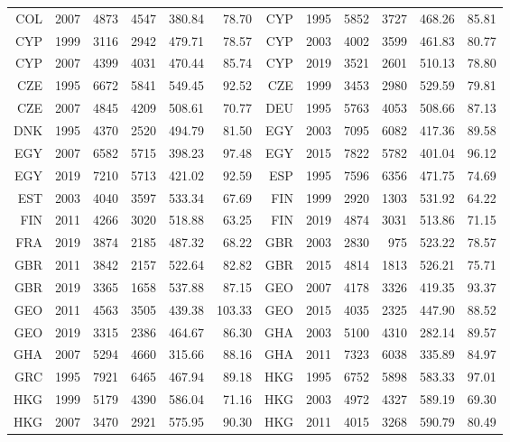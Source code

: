 {\begin{longtable}{r|r|r|r|r|r||r|r|r|r|r|r}
    COL   & 2007  & 4873  & 4547  & 380.84 & 78.70  & CYP   & 1995  & 5852  & 3727  & 468.26 & 85.81 \\
    CYP   & 1999  & 3116  & 2942  & 479.71 & 78.57  & CYP   & 2003  & 4002  & 3599  & 461.83 & 80.77 \\
    CYP   & 2007  & 4399  & 4031  & 470.44 & 85.74  & CYP   & 2019  & 3521  & 2601  & 510.13 & 78.80 \\
    CZE   & 1995  & 6672  & 5841  & 549.45 & 92.52  & CZE   & 1999  & 3453  & 2980  & 529.59 & 79.81 \\
    CZE   & 2007  & 4845  & 4209  & 508.61 & 70.77  & DEU   & 1995  & 5763  & 4053  & 508.66 & 87.13 \\
    DNK   & 1995  & 4370  & 2520  & 494.79 & 81.50  & EGY   & 2003  & 7095  & 6082  & 417.36 & 89.58 \\
    EGY   & 2007  & 6582  & 5715  & 398.23 & 97.48  & EGY   & 2015  & 7822  & 5782  & 401.04 & 96.12 \\
    EGY   & 2019  & 7210  & 5713  & 421.02 & 92.59  & ESP   & 1995  & 7596  & 6356  & 471.75 & 74.69 \\
    EST   & 2003  & 4040  & 3597  & 533.34 & 67.69  & FIN   & 1999  & 2920  & 1303  & 531.92 & 64.22 \\
    FIN   & 2011  & 4266  & 3020  & 518.88 & 63.25  & FIN   & 2019  & 4874  & 3031  & 513.86 & 71.15 \\
    FRA   & 2019  & 3874  & 2185  & 487.32 & 68.22  & GBR   & 2003  & 2830  & 975   & 523.22 & 78.57 \\
    GBR   & 2011  & 3842  & 2157  & 522.64 & 82.82  & GBR   & 2015  & 4814  & 1813  & 526.21 & 75.71 \\
    GBR   & 2019  & 3365  & 1658  & 537.88 & 87.15  & GEO   & 2007  & 4178  & 3326  & 419.35 & 93.37 \\
    GEO   & 2011  & 4563  & 3505  & 439.38 & 103.33 & GEO   & 2015  & 4035  & 2325  & 447.90 & 88.52 \\
    GEO   & 2019  & 3315  & 2386  & 464.67 & 86.30  & GHA   & 2003  & 5100  & 4310  & 282.14 & 89.57 \\
    GHA   & 2007  & 5294  & 4660  & 315.66 & 88.16  & GHA   & 2011  & 7323  & 6038  & 335.89 & 84.97 \\
    GRC   & 1995  & 7921  & 6465  & 467.94 & 89.18  & HKG   & 1995  & 6752  & 5898  & 583.33 & 97.01 \\
    HKG   & 1999  & 5179  & 4390  & 586.04 & 71.16  & HKG   & 2003  & 4972  & 4327  & 589.19 & 69.30 \\
    HKG   & 2007  & 3470  & 2921  & 575.95 & 90.30  & HKG   & 2011  & 4015  & 3268  & 590.79 & 80.49 \\

\end{longtable}}
